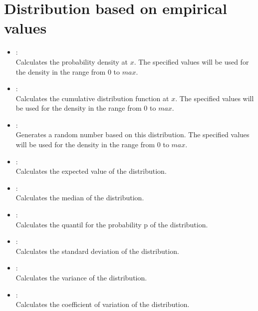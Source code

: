 \section{Distribution based on empirical values}

\begin{itemize}

\item
{}:\\
Calculates the probability density at $x$.
The specified values will be used for the density in the range from 0 to $max$.

\item
{}:\\
Calculates the cumulative distribution function at $x$.
The specified values will be used for the density in the range from 0 to $max$.

\item
{}:\\
Generates a random number based on this distribution.
The specified values will be used for the density in the range from 0 to $max$.

\item
{}:\\
Calculates the expected value of the distribution.

\item
{}:\\
Calculates the median of the distribution.

\item
{}:\\
Calculates the quantil for the probability p of the distribution.

\item
{}:\\
Calculates the standard deviation of the distribution.

\item
{}:\\
Calculates the variance of the distribution.

\item
{}:\\
Calculates the coefficient of variation of the distribution.

\end{itemize}



